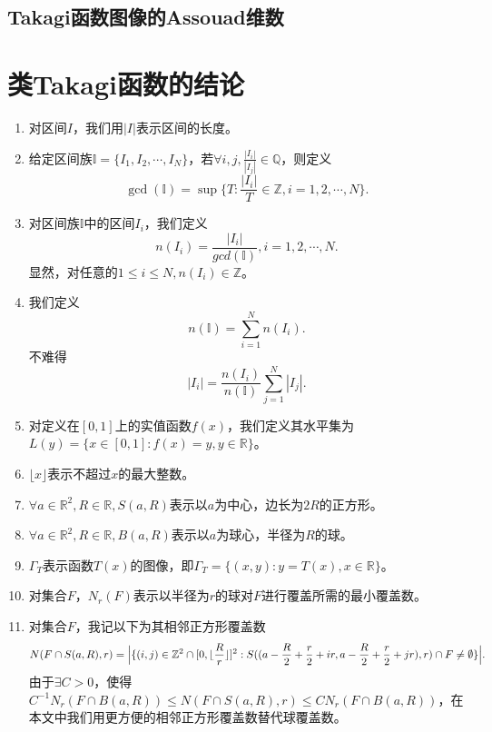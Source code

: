 \subsection{Takagi函数图像的Assouad维数}


\section{类Takagi函数的结论}

\begin{enumerate}

      \item 对区间$I$，我们用$|I|$表示区间的长度。
      \item 给定区间族$\mathbb{I}=\{I_1,I_2,\cdots,I_N\}$，若$\forall i,j,\frac{|I_i|}{|I_j|}\in\mathbb{Q}$，则定义
      $$
            \gcd(\mathbb{I})=\sup\big\{T:\frac{|I_i|}{T}\in\mathbb{Z},i=1,2,\cdots,N\big\}.
      $$
      \item 对区间族$\mathbb{I}$中的区间$I_i$，我们定义
      $$
            n(I_i)=\frac{|I_i|}{gcd(\mathbb{I})},i=1,2,\cdots,N.
      $$
      显然，对任意的$1\le i\le N,n(I_i)\in\mathbb{Z}$。
      \item 我们定义
      $$
            n(\mathbb{I})=\sum_{i=1}^Nn(I_i).
      $$
      不难得
      $$
            |I_i|=\frac{n(I_i)}{n(\mathbb{I})}\sum_{j=1}^N|I_j|.
      $$
      \item 对定义在$[0,1]$上的实值函数$f(x)$，我们定义其水平集为$L(y)=\{x\in[0,1]:f(x)=y,y\in\mathbb{R}\}$。
      \item $\lfloor x \rfloor$表示不超过$x$的最大整数。
      \item $\forall a\in\mathbb{R}^2,R\in\mathbb{R},S(a,R)$表示以$a$为中心，边长为$2R$的正方形。
      \item $\forall a\in\mathbb{R}^2,R\in\mathbb{R},B(a,R)$表示以$a$为球心，半径为$R$的球。
      \item $\Gamma_T$表示函数$T(x)$的图像，即$\Gamma_T=\{(x,y):y=T(x),x\in\mathbb{R}\}$。
      \item 对集合$F$，$N_r(F)$表示以半径为$r$的球对$F$进行覆盖所需的最小覆盖数。
      \item 对集合$F$，我记以下为其相邻正方形覆盖数
      $$
            N(F\cap S(a,R),r)=\Big|\{(i,j)\in\mathbb{Z}^2\cap[0,\lfloor\frac{R}{r}\rfloor]^2:\\
                  S((a-\frac{R}{2}+\frac{r}{2}+ir,a-\frac{R}{2}+\frac{r}{2}+jr),r)\cap F\neq\emptyset\}\Big|.
      $$
      由于$\exists C>0$，使得$C^{-1}N_r(F\cap B(a,R))\le N(F\cap S(a,R),r)\le CN_r(F\cap B(a,R))$，在本文中我们用更方便的相邻正方形覆盖数替代球覆盖数。
\end{enumerate}

